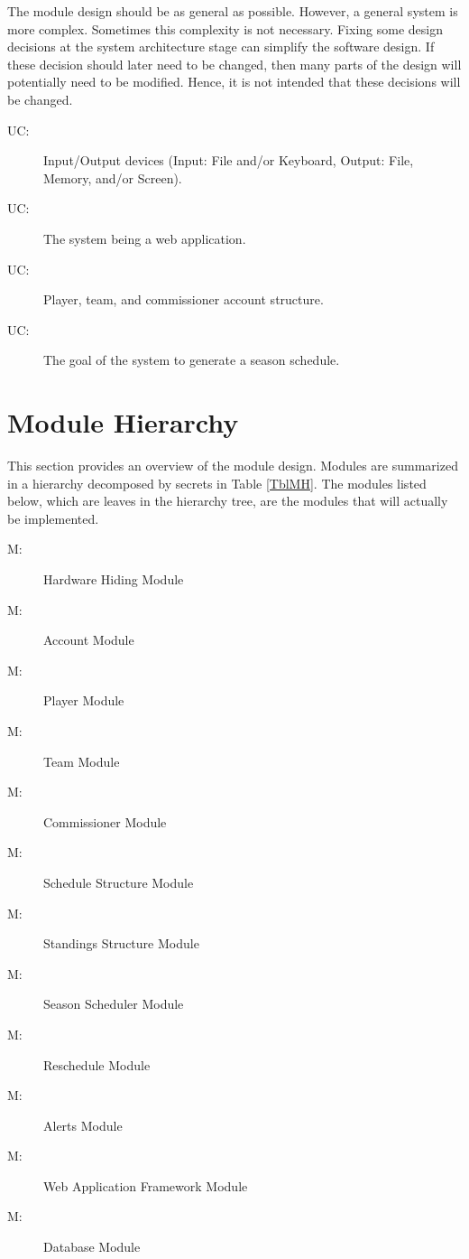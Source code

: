 \documentclass[12pt, titlepage]{article}
\newcounter{ucnum}
\newcommand{\uctheucnum}{UC\theucnum}
\newcounter{mnum}
\newcommand{\mthemnum}{M\themnum}
\begin{document}
The module design should be as general as possible. However, a general system is
more complex. Sometimes this complexity is not necessary. Fixing some design
decisions at the system architecture stage can simplify the software design. If
these decision should later need to be changed, then many parts of the design
will potentially need to be modified. Hence, it is not intended that these
decisions will be changed.

\begin{description}
  \item[ \uctheucnum \label{ucIO}:] Input/Output devices
  (Input: File and/or Keyboard, Output: File, Memory, and/or Screen).
  \item[ \uctheucnum \label{ucWeb}:] The system being a
  web application.
  \item[ \uctheucnum \label{ucAccStr}:] Player, team,
  and commissioner account structure.
  \item[ \uctheucnum \label{ucSched}:] The goal of the
  system to generate a season schedule.
\end{description}

\section{Module Hierarchy} \label{SecMH}

This section provides an overview of the module design. Modules are summarized
in a hierarchy decomposed by secrets in Table \ref{TblMH}. The modules listed
below, which are leaves in the hierarchy tree, are the modules that will
actually be implemented.

\begin{description}
  \item [ \mthemnum \label{mHH}:] Hardware Hiding Module
  \item [ \mthemnum \label{mAC}:] Account Module
  \item [ \mthemnum \label{mPL}:] Player Module
  \item [ \mthemnum \label{mTE}:] Team Module
  \item [ \mthemnum \label{mCM}:] Commissioner Module
  \item [ \mthemnum \label{mSS}:] Schedule Structure
  Module
  \item [ \mthemnum \label{mST}:] Standings Structure
  Module
  \item [ \mthemnum \label{mS}:] Season Scheduler Module
  \item [ \mthemnum \label{mRE}:] Reschedule Module
  \item [ \mthemnum \label{mAL}:] Alerts Module
  \item [ \mthemnum \label{mWA}:] Web Application
  Framework Module
  \item [ \mthemnum \label{mDB}:] Database Module
\end{description}
\end{document}
